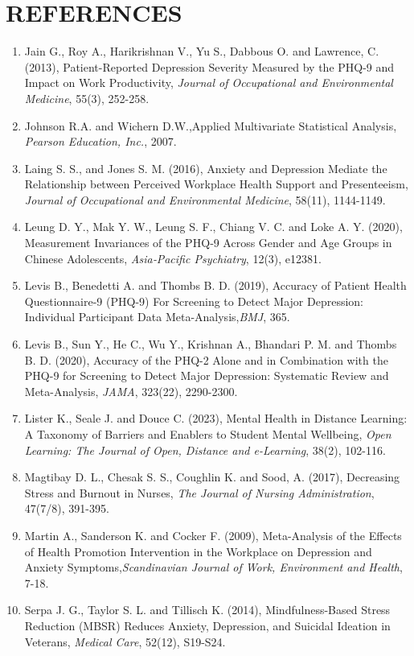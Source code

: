 \documentclass[12pt]{article}
\begin{document}
\section*{REFERENCES}
\begin{enumerate}
	\item Jain G., Roy A., Harikrishnan V., Yu S., Dabbous O. and Lawrence, C. (2013), Patient-Reported Depression Severity Measured by the PHQ-9 and Impact on Work Productivity, \emph{Journal of Occupational and Environmental Medicine}, 55(3), 252-258.
	\item Johnson R.A. and Wichern D.W.,Applied Multivariate Statistical Analysis, \emph{ Pearson Education, Inc.}, 2007.
	
	\item Laing S. S., and Jones S. M. (2016), Anxiety and Depression Mediate the Relationship between Perceived Workplace Health Support and Presenteeism, \emph{Journal of Occupational and Environmental Medicine}, 58(11), 1144-1149.
	
	\item Leung D. Y., Mak Y. W., Leung S. F., Chiang V. C. and Loke A. Y. (2020), Measurement Invariances of the PHQ‐9 Across Gender and Age Groups in Chinese Adolescents,\emph{ Asia‐Pacific Psychiatry}, 12(3), e12381.
	
	\item Levis B., Benedetti A. and Thombs B. D. (2019), Accuracy of Patient Health Questionnaire-9 (PHQ-9) For Screening to Detect Major Depression: Individual Participant Data Meta-Analysis,\emph{BMJ}, 365.
	
	\item Levis B., Sun Y., He C., Wu Y., Krishnan A., Bhandari P. M. and Thombs B. D. (2020), Accuracy of the PHQ-2 Alone and in Combination with the PHQ-9 for Screening to Detect Major Depression: Systematic Review and Meta-Analysis,\emph{ JAMA}, 323(22), 2290-2300.
	
	\item Lister K., Seale J. and Douce C. (2023), Mental Health in Distance Learning: A Taxonomy of Barriers and Enablers to Student Mental Wellbeing, \emph{Open Learning: The Journal of Open, Distance and e-Learning}, 38(2), 102-116.
	
	\item Magtibay D. L., Chesak S. S., Coughlin K. and Sood, A. (2017), Decreasing Stress and Burnout in Nurses, \emph{The Journal of Nursing Administration}, 47(7/8), 391-395.
	
	\item Martin A., Sanderson K. and Cocker F. (2009), Meta-Analysis of the Effects of Health Promotion Intervention in the Workplace on Depression and Anxiety Symptoms,\emph{Scandinavian Journal of Work, Environment and Health}, 7-18.
	
	\item Serpa J. G., Taylor S. L. and Tillisch K. (2014), Mindfulness-Based Stress Reduction (MBSR) Reduces Anxiety, Depression, and Suicidal Ideation in Veterans, \emph{Medical Care}, 52(12), S19-S24.
\end{enumerate}
\end{document}
